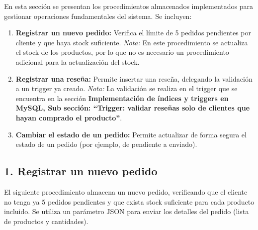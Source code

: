 En esta sección se presentan los procedimientos almacenados implementados para gestionar operaciones fundamentales del sistema. Se incluyen:

\begin{enumerate}
  \item \textbf{Registrar un nuevo pedido:} Verifica el límite de 5 pedidos pendientes por cliente y que haya stock suficiente. \emph{Nota:} En este procedimiento se actualiza el stock de los productos, por lo que no es necesario un procedimiento adicional para la actualización del stock.
  \item \textbf{Registrar una reseña:} Permite insertar una reseña, delegando la validación a un trigger ya creado. \emph{Nota:} La validación se realiza en el trigger que se encuentra en la sección \textbf{Implementación de índices y triggers en MySQL, Sub sección: ``Trigger: validar reseñas solo de clientes que hayan comprado el producto''}.
  \item \textbf{Cambiar el estado de un pedido:} Permite actualizar de forma segura el estado de un pedido (por ejemplo, de pendiente a enviado).
\end{enumerate}

\subsection{1. Registrar un nuevo pedido}

El siguiente procedimiento almacena un nuevo pedido, verificando que el cliente no tenga ya 5 pedidos pendientes y que exista stock suficiente para cada producto incluido. Se utiliza un parámetro JSON para enviar los detalles del pedido (lista de productos y cantidades).


